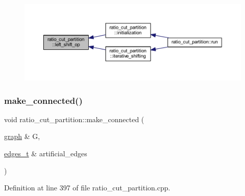 \begin{figure}[H]
\begin{center}
\leavevmode
\includegraphics[width=350pt]{classratio__cut__partition_af736bd4e468935c1b1642f78d3df665d_icgraph}
\end{center}
\end{figure}
\mbox{\label{classratio__cut__partition_a46dba3eabbf31ce9d3545ba67fba1b62}} 
\subsubsection{\texorpdfstring{make\+\_\+connected()}{make\_connected()}}
{\footnotesize\ttfamily void ratio\+\_\+cut\+\_\+partition\+::make\+\_\+connected (\begin{DoxyParamCaption}\item[{\mbox{\hyperlink{classgraph}{graph}} \&}]{G,  }\item[{\mbox{\hyperlink{edge_8h_a8f9587479bda6cf612c103494b3858e3}{edges\+\_\+t}} \&}]{artificial\+\_\+edges }\end{DoxyParamCaption})\hspace{0.3cm}{\ttfamily [protected]}}



Definition at line 397 of file ratio\+\_\+cut\+\_\+partition.\+cpp.


